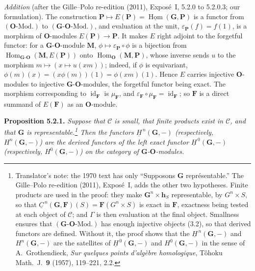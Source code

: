 \par\medskip\noindent
\emph{Addition} (after the Gille--Polo re-edition (2011), Exposé~I, 5.2.0 to
5.2.0.3; our formulation). The construction
\(\mathbf P\mapsto E(\mathbf P)=\underline{\operatorname{Hom}}(\mathbf G,\mathbf P)\)
is a functor from \((\mathbf O\text{-Mod.})\) to
\((\mathbf G\text{-}\mathbf O\text{-Mod.})\), and evaluation at the unit,
\(\varepsilon_{\mathbf P}(f)=f(1)\), is a morphism of \(\mathbf O\)-modules
\(E(\mathbf P)\to\mathbf P\). It makes \(E\) right adjoint to the forgetful
functor: for a \(\mathbf G\)-\(\mathbf O\)-module \(\mathbf M\),
\(\phi\mapsto\varepsilon_{\mathbf P}\circ\phi\) is a bijection from
\(\operatorname{Hom}_{\mathbf G\text{-}\mathbf O}(\mathbf M,E(\mathbf P))\)
onto \(\operatorname{Hom}_{\mathbf O}(\mathbf M,\mathbf P)\), whose inverse
sends \(u\) to the morphism \(m\mapsto(x\mapsto u(xm))\); indeed, if
\(\phi\) is equivariant, \(\phi(m)(x)=(x\phi(m))(1)=\phi(xm)(1)\). Hence
\(E\) carries injective \(\mathbf O\)-modules to injective
\(\mathbf G\)-\(\mathbf O\)-modules, the forgetful functor being exact. The
morphism corresponding to \(\operatorname{id}_{\mathbf F}\) is
\(\mu_{\mathbf F}\), and \(\varepsilon_{\mathbf F}\circ\mu_{\mathbf F}
=\operatorname{id}_{\mathbf F}\); so \(\mathbf F\) is a direct summand of
\(E(\mathbf F)\) as an \(\mathbf O\)-module.
\par\medskip

\medskip
\noindent{}\textbf{Proposition 5.2.1.}
\textit{Suppose that \(\mathscr C\) is small, that finite products exist
in \(\mathscr C\), and that \(\mathbf G\) is representable.\footnote{Translator's note: the 1970 text has only ``Supposons
\(\mathbf G\) représentable.'' The Gille--Polo re-edition (2011),
Exposé~I, adds the other two hypotheses. Finite products are used in the
proof: they make \(\mathbf G^n\times\mathbf h_S\) representable, by
\(G^n\times S\), so that
\(\underline C^{\,n}(\mathbf G,\mathbf F)(S)=\mathbf F(G^n\times S)\) is
exact in \(\mathbf F\), exactness being tested at each object of
\(\mathscr C\); and \(\Gamma\) is then evaluation at the final object.
Smallness ensures that \((\mathbf G\text{-}\mathbf O\text{-Mod.})\) has
enough injective objects (3.2), so that derived functors are defined.
Without it, the proof shows that the \(\underline H^{\,n}(\mathbf G,-)\) and
\(H^n(\mathbf G,-)\) are the satellites of \(\underline H^{\,0}(\mathbf G,-)\)
and \(H^0(\mathbf G,-)\) in the sense of A.~Grothendieck, \textit{Sur quelques points d'algèbre homologique}, Tôhoku Math.\ J.\ \textbf{9} (1957), 119--221, 2.2.} Then the
functors \(\underline H^{\,n}(\mathbf G,-)\) (respectively,
\(H^n(\mathbf G,-)\)) are the derived functors of the left exact functor
\(\underline H^{\,0}(\mathbf G,-)\) (respectively,
\(H^0(\mathbf G,-)\)) on the category of
\(\mathbf G\)-\(\mathbf O\)-modules.}

